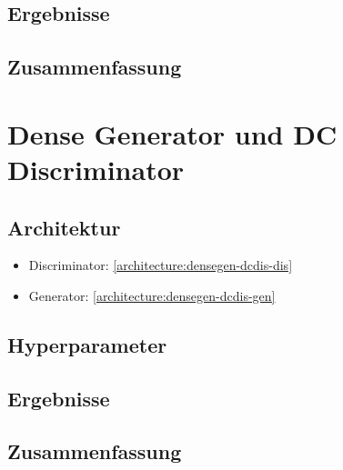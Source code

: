 \subsection{Ergebnisse}
\subsection{Zusammenfassung}

\section{Dense Generator und DC Discriminator}
\subsection{Architektur}
\begin{itemize}
	\item Discriminator: \cref{architecture:densegen-dcdis-dis}
	\item Generator: \cref{architecture:densegen-dcdis-gen}
\end{itemize}
\subsection{Hyperparameter}
\subsection{Ergebnisse}
\subsection{Zusammenfassung}
